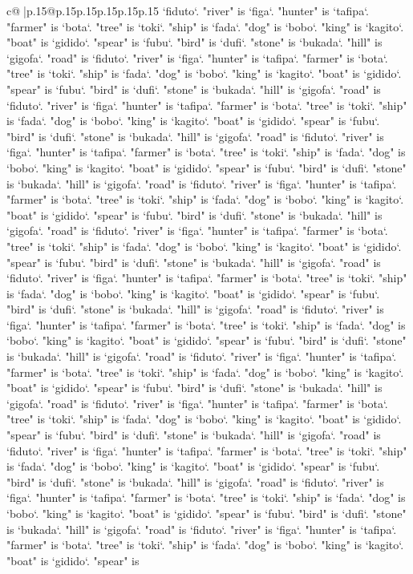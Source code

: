\documentclass{article}
\begin{document}
{\begin{supertabular}{c@{$\;$}|p{.15\linewidth}@{}p{.15\linewidth}p{.15\linewidth}p{.15\linewidth}p{.15\linewidth}p{.15\linewidth}}
{{{`fiduto`. "river" is `figa`. "hunter" is `tafipa`. "farmer" is `bota`. "tree" is `toki`. "ship" is `fada`. "dog" is `bobo`. "king" is `kagito`. "boat" is `gidido`. "spear" is `fubu`. "bird" is `dufi`. "stone" is `bukada`. "hill" is `gigofa`. "road" is `fiduto`. "river" is `figa`. "hunter" is `tafipa`. "farmer" is `bota`. "tree" is `toki`. "ship" is `fada`. "dog" is `bobo`. "king" is `kagito`. "boat" is `gidido`. "spear" is `fubu`. "bird" is `dufi`. "stone" is `bukada`. "hill" is `gigofa`. "road" is `fiduto`. "river" is `figa`. "hunter" is `tafipa`. "farmer" is `bota`. "tree" is `toki`. "ship" is `fada`. "dog" is `bobo`. "king" is `kagito`. "boat" is `gidido`. "spear" is `fubu`. "bird" is `dufi`. "stone" is `bukada`. "hill" is `gigofa`. "road" is `fiduto`. "river" is `figa`. "hunter" is `tafipa`. "farmer" is `bota`. "tree" is `toki`. "ship" is `fada`. "dog" is `bobo`. "king" is `kagito`. "boat" is `gidido`. "spear" is `fubu`. "bird" is `dufi`. "stone" is `bukada`. "hill" is `gigofa`. "road" is `fiduto`. "river" is `figa`. "hunter" is `tafipa`. "farmer" is `bota`. "tree" is `toki`. "ship" is `fada`. "dog" is `bobo`. "king" is `kagito`. "boat" is `gidido`. "spear" is `fubu`. "bird" is `dufi`. "stone" is `bukada`. "hill" is `gigofa`. "road" is `fiduto`. "river" is `figa`. "hunter" is `tafipa`. "farmer" is `bota`. "tree" is `toki`. "ship" is `fada`. "dog" is `bobo`. "king" is `kagito`. "boat" is `gidido`. "spear" is `fubu`. "bird" is `dufi`. "stone" is `bukada`. "hill" is `gigofa`. "road" is `fiduto`. "river" is `figa`. "hunter" is `tafipa`. "farmer" is `bota`. "tree" is `toki`. "ship" is `fada`. "dog" is `bobo`. "king" is `kagito`. "boat" is `gidido`. "spear" is `fubu`. "bird" is `dufi`. "stone" is `bukada`. "hill" is `gigofa`. "road" is `fiduto`. "river" is `figa`. "hunter" is `tafipa`. "farmer" is `bota`. "tree" is `toki`. "ship" is `fada`. "dog" is `bobo`. "king" is `kagito`. "boat" is `gidido`. "spear" is `fubu`. "bird" is `dufi`. "stone" is `bukada`. "hill" is `gigofa`. "road" is `fiduto`. "river" is `figa`. "hunter" is `tafipa`. "farmer" is `bota`. "tree" is `toki`. "ship" is `fada`. "dog" is `bobo`. "king" is `kagito`. "boat" is `gidido`. "spear" is `fubu`. "bird" is `dufi`. "stone" is `bukada`. "hill" is `gigofa`. "road" is `fiduto`. "river" is `figa`. "hunter" is `tafipa`. "farmer" is `bota`. "tree" is `toki`. "ship" is `fada`. "dog" is `bobo`. "king" is `kagito`. "boat" is `gidido`. "spear" is `fubu`. "bird" is `dufi`. "stone" is `bukada`. "hill" is `gigofa`. "road" is `fiduto`. "river" is `figa`. "hunter" is `tafipa`. "farmer" is `bota`. "tree" is `toki`. "ship" is `fada`. "dog" is `bobo`. "king" is `kagito`. "boat" is `gidido`. "spear" is `fubu`. "bird" is `dufi`. "stone" is `bukada`. "hill" is `gigofa`. "road" is `fiduto`. "river" is `figa`. "hunter" is `tafipa`. "farmer" is `bota`. "tree" is `toki`. "ship" is `fada`. "dog" is `bobo`. "king" is `kagito`. "boat" is `gidido`. "spear" is `fubu`. "bird" is `dufi`. "stone" is `bukada`. "hill" is `gigofa`. "road" is `fiduto`. "river" is `figa`. "hunter" is `tafipa`. "farmer" is `bota`. "tree" is `toki`. "ship" is `fada`. "dog" is `bobo`. "king" is `kagito`. "boat" is `gidido`. "spear" is }}}
\end{supertabular}}
\end{document}
